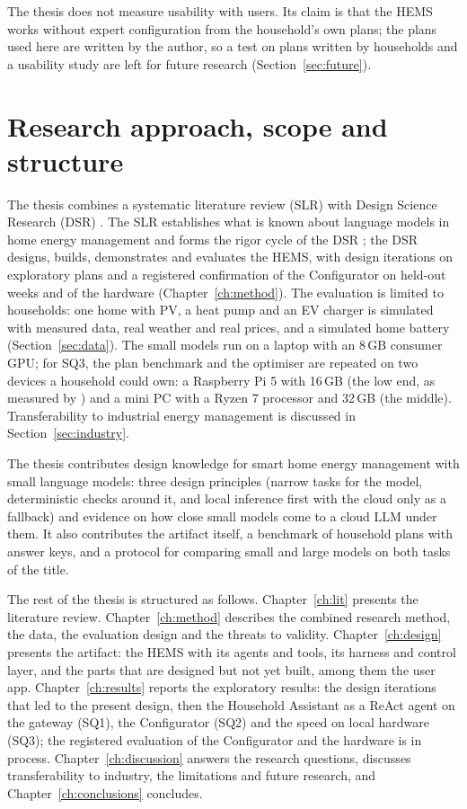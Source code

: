 The thesis does not measure usability with users. Its claim is that the
HEMS works without expert configuration from the household's own plans;
the plans used here are written by the author, so a test on plans
written by households and a usability study are left for future
research (Section~\ref{sec:future}).

\section{Research approach, scope and structure}
\label{sec:approach}

The thesis combines a systematic literature review (SLR)
\parencite{kitchenham2007} with Design Science Research (DSR)
\parencite{hevner2004,peffers2007}. The SLR establishes what is known
about language models in home energy management and forms the rigor
cycle of the DSR \parencite{hevner2007}; the DSR designs, builds,
demonstrates and evaluates the HEMS, with design
iterations on exploratory plans and a registered confirmation of the
Configurator on held-out weeks and of the hardware
(Chapter~\ref{ch:method}). The evaluation is limited to
households: one home with PV, a heat pump and an EV charger is
simulated with measured data, real weather and real prices, and a
simulated home battery (Section~\ref{sec:data}). The small models run on a laptop with an
8\,GB consumer GPU; for SQ3, the plan benchmark and the optimiser are
repeated on two devices a household could own: a Raspberry Pi 5 with
16\,GB (the low end, as measured by \textcite{islam2025}) and a mini PC
with a Ryzen 7 processor and 32\,GB (the middle). Transferability to industrial energy
management is discussed in Section~\ref{sec:industry}.

The thesis contributes design knowledge for smart home energy
management with small language models: three design principles (narrow
tasks for the model, deterministic checks around it, and local
inference first with the cloud only as a fallback) and evidence on how
close small models come to a cloud LLM under them. It also contributes
the artifact itself, a benchmark of household plans with answer keys,
and a protocol for comparing small and large models on both tasks of
the title.

The rest of the thesis is structured as follows. Chapter~\ref{ch:lit}
presents the literature review. Chapter~\ref{ch:method} describes the
combined research method, the data, the evaluation design and the
threats to validity. Chapter~\ref{ch:design} presents the artifact: the
HEMS with its agents and tools, its harness and control layer, and the
parts that are designed but not yet built, among them the user app.
Chapter~\ref{ch:results} reports the exploratory results: the design
iterations that led to the present design, then the Household
Assistant as a ReAct agent on the gateway (SQ1), the Configurator
(SQ2) and the speed on local hardware (SQ3);
the registered evaluation of the Configurator and the hardware is in
process. Chapter~\ref{ch:discussion}
answers the research questions, discusses transferability to industry,
the limitations and future research, and Chapter~\ref{ch:conclusions}
concludes.

